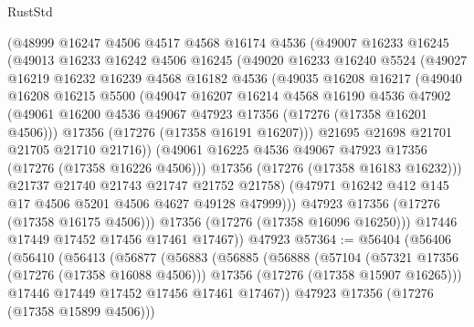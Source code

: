 \begin{lexlean}{RustStd}
\begin{coremodule}
          (@48999
            @16247
            @4506
            @4517
            @4568
            @16174
            @4536
            (@49007
              @16233
              @16245
              (@49013
                @16233
                @16242
                @4506
                @16245
                (@49020
                  @16233
                  @16240
                  @5524
                  (@49027
                    @16219
                    @16232
                    @16239
                    @4568
                    @16182
                    @4536
                    (@49035
                      @16208
                      @16217
                      (@49040
                        @16208
                        @16215
                        @5500
                        (@49047
                          @16207
                          @16214
                          @4568
                          @16190
                          @4536
                          @47902
                          (@49061 @16200 @4536 @49067 @47923 @17356 (@17276 (@17358 @16201 @4506)))
                          @17356
                          (@17276 (@17358 @16191 @16207)))
                        @21695
                        @21698
                        @21701
                        @21705
                        @21710
                        @21716))
                    (@49061 @16225 @4536 @49067 @47923 @17356 (@17276 (@17358 @16226 @4506)))
                    @17356
                    (@17276 (@17358 @16183 @16232)))
                  @21737
                  @21740
                  @21743
                  @21747
                  @21752
                  @21758)
                (@47971 @16242 @412 @145 @17 @4506 @5201 @4506 @4627 @49128 @47999)))
            @47923
            @17356
            (@17276 (@17358 @16175 @4506)))
          @17356
          (@17276 (@17358 @16096 @16250)))
        @17446
        @17449
        @17452
        @17456
        @17461
        @17467))
    @47923
@57364 := @56404
    (@56406
      (@56410
        (@56413
          (@56877
            (@56883
              (@56885
                (@56888
                  (@57104
                    (@57321 @17356 (@17276 (@17358 @16088 @4506)))
                    @17356
                    (@17276 (@17358 @15907 @16265)))
                  @17446
                  @17449
                  @17452
                  @17456
                  @17461
                  @17467))
              @47923
              @17356
              (@17276 (@17358 @15899 @4506)))

\end{coremodule}
\end{lexlean}

